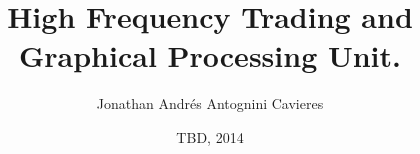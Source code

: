 \pagestyle{fancy}

\rhead[]{\leftmark}
\lhead[\rightmark]{}
\cfoot{}

\renewcommand{\chaptermark}[1]{\markleft{\thechapter #1}}
\renewcommand{\sectionmark}[1]{\markright{\thesection #1}}
\renewcommand{\chaptermark}[1]{\markboth{\chaptername \ \thechapter. #1}{}}

\newcommand{\contrib}[3]{#1\quad$<$\texttt{#2}$>$%
{\small\\\quad\textit{#3}}\\[1ex]}

\newcommand{\titulo}{%
    High Frequency Trading and Graphical Processing Unit.
}%
\newcommand{\autor}{Jonathan Andrés Antognini Cavieres}

\title{\titulo}
\author{\autor}

\date{TBD, 2014}
\frenchspacing
\makeindex

